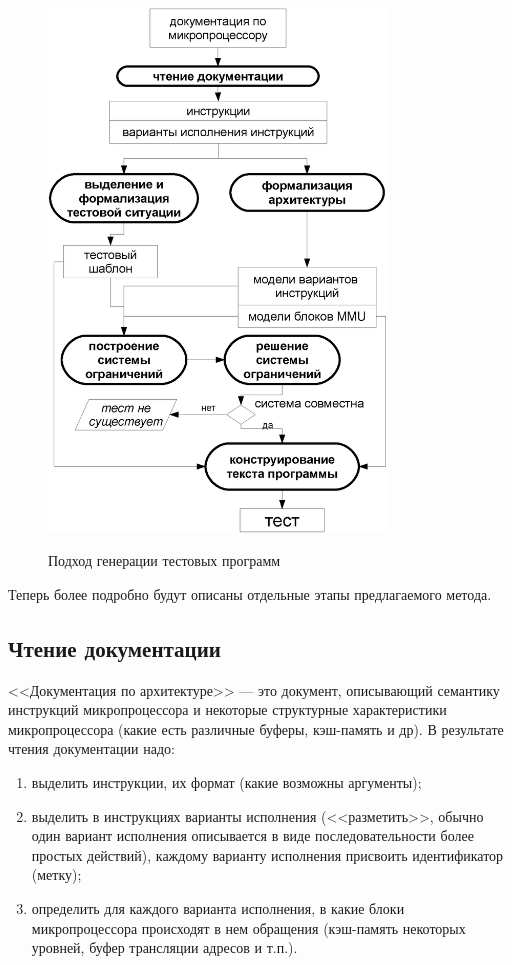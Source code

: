 \begin{figure}[p] \center
  \includegraphics[width=0.8\textwidth]{2.theor/process_manual}\\
  \caption{Подход генерации тестовых программ}\label{fig:process}
\end{figure}

Теперь более подробно будут описаны отдельные этапы предлагаемого метода.

\subsection{Чтение документации}\label{sec:reading_stage}

<<Документация по архитектуре>> --- это документ, описывающий семантику инструкций микропроцессора и некоторые структурные характеристики микропроцессора (какие есть различные буферы, кэш-память и др).
В результате чтения документации надо:
\begin{enumerate}
  \item выделить инструкции, их формат (какие возможны аргументы);
  \item выделить в инструкциях варианты исполнения (<<разметить>>, обычно один вариант исполнения описывается в виде последовательности более простых действий), каждому варианту исполнения присвоить идентификатор (метку);
  \item определить для каждого варианта исполнения, в какие блоки микропроцессора происходят в нем обращения (кэш-память некоторых уровней, буфер трансляции адресов и т.п.).
\end{enumerate}

